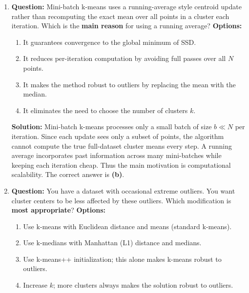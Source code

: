 \documentclass{article}
\begin{document}
\begin{enumerate}
\textbf{Solution:} \newline
Because $p(x_i)$ is proportional to $D(x_i)^2$, points with larger distance
to their nearest already-chosen centroid receive larger probability mass.
This encourages centroids to be well-separated and spread across the dataset.
Therefore, the correct answer is \textbf{(b)}.


\item \textbf{Question:} \newline
Mini-batch k-means uses a running-average style centroid update rather than
recomputing the exact mean over all points in a cluster each iteration.
Which is the \textbf{main reason} for using a running average?
\newline \newline
\textbf{Options:}
\begin{enumerate}
    \item It guarantees convergence to the global minimum of SSD.
    \item It reduces per-iteration computation by avoiding full passes over all $N$ points.
    \item It makes the method robust to outliers by replacing the mean with the median.
    \item It eliminates the need to choose the number of clusters $k$.
\end{enumerate}

\textbf{Solution:} \newline
Mini-batch k-means processes only a small batch of size $b\ll N$ per iteration.
Since each update sees only a subset of points, the algorithm cannot compute the
true full-dataset cluster means every step. A running average incorporates past
information across many mini-batches while keeping each iteration cheap.
Thus the main motivation is computational scalability. The correct answer is \textbf{(b)}.


\item \textbf{Question:} \newline
You have a dataset with occasional extreme outliers. You want cluster centers to be
less affected by these outliers. Which modification is \textbf{most appropriate}?
\newline \newline
\textbf{Options:}
\begin{enumerate}
    \item Use k-means with Euclidean distance and means (standard k-means).
    \item Use k-medians with Manhattan (L1) distance and medians.
    \item Use k-means++ initialization; this alone makes k-means robust to outliers.
    \item Increase $k$; more clusters always makes the solution robust to outliers.
\end{enumerate}


\end{enumerate}
\end{document}
